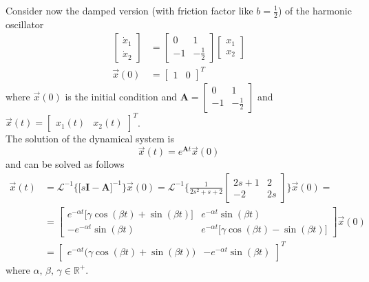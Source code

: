 \documentclass[12pt,a4paper,oneside]{book}
\begin{document}
\begin{onehalfspace}
Consider now the damped version (with friction factor like $b=\frac{1}{2}$) of 
the harmonic oscillator 
\begin{equation}
	\begin{aligned}
		\begin{bmatrix} \dot{x}_1 \\ \dot{x}_2 \end{bmatrix} &= \begin{bmatrix} 
		0 & 1 \\ -1 & -\frac{1}{2} \end{bmatrix} \begin{bmatrix} {x}_1 \\ {x}_2 
		\end{bmatrix} \\[6pt]
		\vec{x}(0) &= \begin{bmatrix} 1 & 0 \end{bmatrix}^T
	\end{aligned}
\end{equation}
where $\vec{x}(0)$ is the initial condition and $\mathbf{A} = \begin{bmatrix} 0 
& 1 \\ -1 & -\frac{1}{2} \end{bmatrix}$ and $\vec{x}(t)= \begin{bmatrix} x_1(t) 
& x_2(t) \end{bmatrix}^T$.\\

The solution of the dynamical system is
\begin{equation}
	\vec{x}(t) = e^{\mathbf{A}t}\vec{x}(0)
\end{equation}
and can be solved as follows
\begin{equation}
	\begin{aligned}
		\vec{x}(t) &= 
		\mathcal{L}^{-1}\Big\{\Big[s\mathbf{I}-\mathbf{A}\Big]^{-1}\Big\}\vec{x}(0)
		 = \mathcal{L}^{-1}\Big\{\frac{1}{2s^2+s+2}\begin{bmatrix} 2s+1 & 2 \\ 
		-2 & 2s \end{bmatrix}\Big\}\vec{x}(0) = \\[6pt]
		&= \begin{bmatrix} e^{-\alpha t}\Big[\gamma \cos(\beta t)+\sin(\beta 
		t)\Big] & e^{-\alpha t}\sin(\beta t) \\ -e^{-\alpha t}\sin(\beta t) & 
		e^{-\alpha t}\Big[\gamma \cos(\beta t)-\sin(\beta t)\Big] 
		\end{bmatrix}\vec{x}(0) \\[6pt]
		&= \begin{bmatrix} e^{-\alpha t}\Big(\gamma \cos(\beta t)+\sin(\beta 
		t)\Big) & -e^{-\alpha t}\sin(\beta t) \end{bmatrix}^T
	\end{aligned}
\end{equation}
where $\alpha,\,\beta,\,\gamma\in\mathbb{R}^+$.


\end{onehalfspace}
\end{document}
